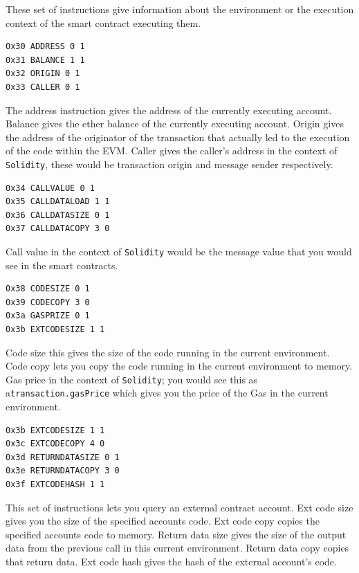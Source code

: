 These set of instructions give information about the environment or the execution context of the smart contract executing them.

\begin{lstlisting}[style=defaultStyle, caption={Address, balance, origin and caller instructions.}]
0x30 ADDRESS 0 1
0x31 BALANCE 1 1
0x32 ORIGIN 0 1
0x33 CALLER 0 1
\end{lstlisting}

The address instruction gives the address of the currently executing account.
Balance gives the ether balance of the currently executing account.
Origin gives the address of the originator of the transaction that actually led to the execution of the code within the EVM.
Caller gives the caller's address in the context of \texttt{Solidity}, these would be transaction origin and message sender respectively.

\begin{lstlisting}[style=defaultStyle, caption={Call value, call data load, call data size and call data copy instructions.}]
0x34 CALLVALUE 0 1
0x35 CALLDATALOAD 1 1
0x36 CALLDATASIZE 0 1
0x37 CALLDATACOPY 3 0
\end{lstlisting}

Call value in the context of \texttt{Solidity} would be the message value that you would see in the smart contracts.

\begin{lstlisting}[style=defaultStyle, caption={Code size, code copy and gas price instructions.}]
0x38 CODESIZE 0 1
0x39 CODECOPY 3 0
0x3a GASPRIZE 0 1
0x3b EXTCODESIZE 1 1
\end{lstlisting}

Code size this gives the size of the code running in the current environment.
Code copy lets you copy the code running in the current environment to memory.
Gas price in the context of \texttt{Solidity}; you would see this as a\linebreak\texttt{transaction.gasPrice} which gives you the price of the Gas in the current environment.

\begin{lstlisting}[style=defaultStyle, caption={Ext code size, ext code copy, return data size, return data copy and ext code hash instructions.}]
0x3b EXTCODESIZE 1 1
0x3c EXTCODECOPY 4 0
0x3d RETURNDATASIZE 0 1
0x3e RETURNDATACOPY 3 0
0x3f EXTCODEHASH 1 1
\end{lstlisting}

This set of instructions lets you query an external contract account.
Ext code size gives you the size of the specified accounts code.
Ext code copy copies the specified accounts code to memory. 
Return data size gives the size of the output data from the previous call in this current environment.
Return data copy copies that return data.
Ext code hash gives the hash of the external account's code.


